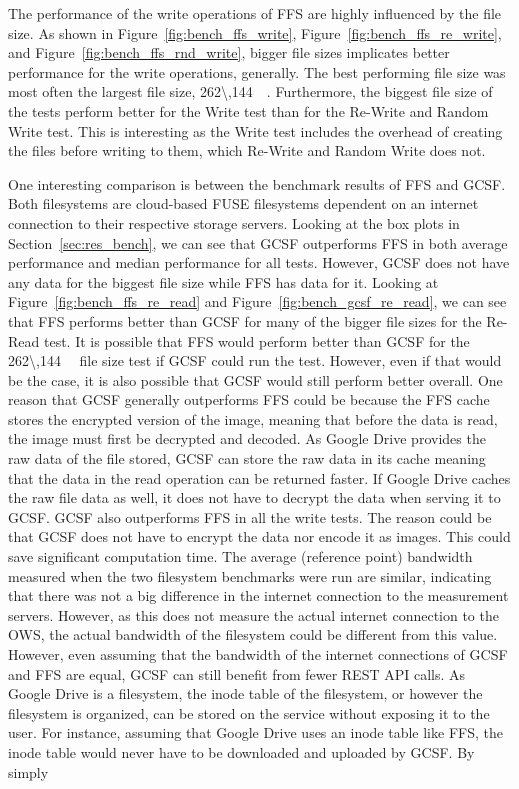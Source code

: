 The performance of the write operations of \gls{FFS} are highly influenced by the file size. As shown in Figure~\ref{fig:bench_ffs_write}, Figure~\ref{fig:bench_ffs_re_write}, and Figure~\ref{fig:bench_ffs_rnd_write}, bigger file sizes implicates better performance for the write operations, generally. The best performing file size was most often the largest file size, \SI[per-mode = symbol]{262\,144}{\kilo\byte}. Furthermore, the biggest file size of the tests perform better for the Write test than for the \mbox{Re-Write} and Random Write test. This is interesting as the Write test includes the overhead of creating the files before writing to them, which \mbox{Re-Write} and Random Write does not.

One interesting comparison is between the benchmark results of \gls{FFS} and \gls{GCSF}. Both filesystems are \mbox{cloud-based} \gls{FUSE} filesystems dependent on an internet connection to their respective storage servers. Looking at the box plots in Section~\ref{sec:res_bench}, we can see that \gls{GCSF} outperforms \gls{FFS} in both average performance and median performance for all tests. However, \gls{GCSF} does not have any data for the biggest file size while \gls{FFS} has data for it. Looking at Figure~\ref{fig:bench_ffs_re_read} and Figure~\ref{fig:bench_gcsf_re_read}, we can see that \gls{FFS} performs better than \gls{GCSF} for many of the bigger file sizes for the \mbox{Re-Read} test. It is possible that \gls{FFS} would perform better than \gls{GCSF} for the \SI{262\,144}{\kilo\byte} file size test if \gls{GCSF} could run the test. However, even if that would be the case, it is also possible that \gls{GCSF} would still perform better overall. One reason that \gls{GCSF} generally outperforms \gls{FFS} could be because the \gls{FFS} cache stores the encrypted version of the image, meaning that before the data is read, the image must first be decrypted and decoded. As Google Drive provides the raw data of the file stored, \gls{GCSF} can store the raw data in its cache meaning that the data in the read operation can be returned faster. If Google Drive caches the raw file data as well, it does not have to decrypt the data when serving it to \gls{GCSF}. \gls{GCSF} also outperforms \gls{FFS} in all the write tests. The reason could be that \gls{GCSF} does not have to encrypt the data nor encode it as images. This could save significant computation time. The average (reference point) bandwidth measured when the two filesystem benchmarks were run are similar, indicating that there was not a big difference in the internet connection to the measurement servers. However, as this does not measure the actual internet connection to the \gls{OWS}, the actual bandwidth of the filesystem could be different from this value. However, even assuming that the bandwidth of the internet connections of \gls{GCSF} and \gls{FFS} are equal, \gls{GCSF} can still benefit from fewer REST \gls{API} calls. As Google Drive is a filesystem, the inode table of the filesystem, or however the filesystem is organized, can be stored on the service without exposing it to the user. For instance, assuming that Google Drive uses an inode table like \gls{FFS}, the inode table would never have to be downloaded and uploaded by \gls{GCSF}. By simply 